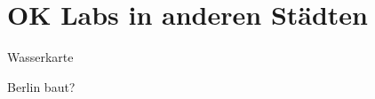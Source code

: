 \section{OK Labs in anderen Städten}

\begin{frame}[t]{Wasserkarte}
\end{frame}


\begin{frame}[t]{Berlin baut?}
\end{frame}